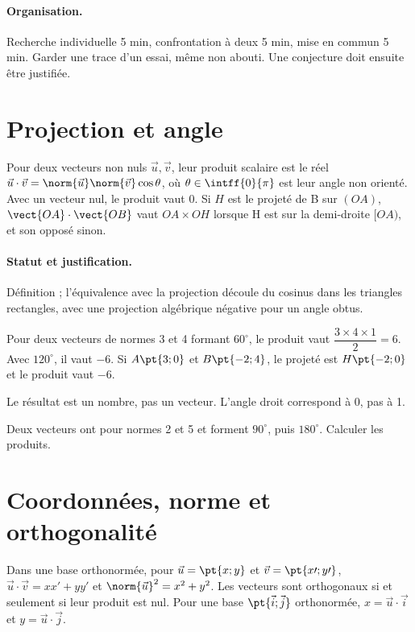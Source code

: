 \paragraph{Organisation.} Recherche individuelle 5 min, confrontation à deux 5 min, mise en commun 5 min. Garder une trace d’un essai, même non abouti. Une conjecture doit ensuite être justifiée.
\mxnewpage
\section{Projection et angle}\label{C03-U1}
\begin{keypoint}
Pour deux vecteurs non nuls $\vec u,\vec v$, leur produit scalaire est le réel $\vec u\cdot\vec v=\norm{\vec u}\norm{\vec v}\cos\theta$, où $\theta\in\intff{0}{\pi}$ est leur angle non orienté. Avec un vecteur nul, le produit vaut 0. Si $H$ est le projeté de B sur $(OA)$, $\vect{OA}\cdot\vect{OB}$ vaut $OA\times OH$ lorsque H est sur la demi-droite $[OA)$, et son opposé sinon.
\end{keypoint}
\paragraph{Statut et justification.} Définition ; l’équivalence avec la projection découle du cosinus dans les triangles rectangles, avec une projection algébrique négative pour un angle obtus.
\begin{example}Pour deux vecteurs de normes 3 et 4 formant $60^\circ$, le produit vaut $\dfrac{3\times 4\times 1}{2}=6$. Avec $120^\circ$, il vaut $-6$. Si $A\pt{3;0}$ et $B\pt{-2;4}$, le projeté est $H\pt{-2;0}$ et le produit vaut $-6$.\end{example}\label{C03-EX1}
\begin{pitfall}Le résultat est un nombre, pas un vecteur. L’angle droit correspond à 0, pas à 1.\end{pitfall}
\begin{application}Deux vecteurs ont pour normes 2 et 5 et forment $90^\circ$, puis $180^\circ$. Calculer les produits.\end{application}\label{C03-AP1}
\section{Coordonnées, norme et orthogonalité}\label{C03-U2}
\begin{keypoint}
Dans une base orthonormée, pour $\vec u=\pt{x;y}$ et $\vec v=\pt{x\prime;y\prime}$, $\vec u\cdot\vec v=xx\prime+yy\prime$ et $\norm{\vec u}^2=x^2+y^2$. Les vecteurs sont orthogonaux si et seulement si leur produit est nul. Pour une base $\pt{\vec i;\vec j}$ orthonormée, $x=\vec u\cdot\vec i$ et $y=\vec u\cdot\vec j$.
\end{keypoint}
